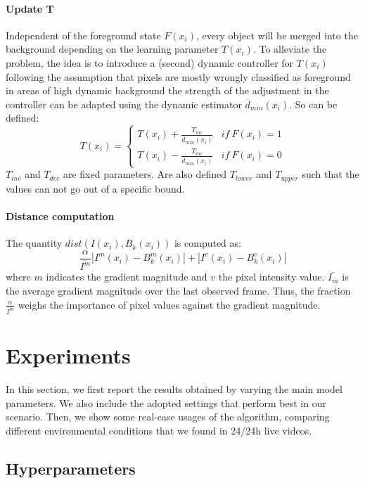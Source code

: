 \paragraph{Update T}
Independent of the foreground state $F(x_i)$, every object will be merged into the background depending on the learning parameter
$T(x_i)$. To alleviate the problem, the idea is to introduce a
(second) dynamic controller for $T(x_i)$ following the assumption that pixels are mostly wrongly classified as foreground in areas of high dynamic background the strength of the adjustment in the controller can be adapted using the dynamic estimator $\overline{d}_{min}(x_i)$. So can be defined:
\begin{equation}
T(x_i)=\begin{cases} T(x_i)+\frac{T_{inc}}{\overline{d}_{min}(x_i)} &if \ F(x_i)=1 \\ T(x_i)-\frac{T_{inc}}{\overline{d}_{min}(x_i)} &if \ F(x_i)=0 \end{cases}
\end{equation}
$T_{inc}$ and $T_{dec}$ are fixed parameters. Are also defined $T_{lower}$ and $T_{upper}$ such that the values can not go out of a specific bound.
\paragraph{Distance computation}
The quantity $ dist(I(x_i),B_k(x_i)) $ is computed as:
\begin{equation} \label{eq:dist}
\frac{\alpha}{\overline{I^m}}|I^m(x_i) - B_k^m(x_i)| + |I^v(x_i) - B_k^v(x_i)|
\end{equation}
where $m$ indicates the gradient magnitude and $v$ the pixel intensity value. $\overline{I_m}$ is the average gradient magnitude over the last observed frame. Thus, the fraction $\frac{\alpha}{\overline{I^m}}$ weighs the importance of pixel values against the gradient magnitude.

\section*{Experiments}

In this section, we first report the results obtained by varying the main model parameters. We also include the adopted settings that perform best in our scenario. Then, we show some real-case usages of the algorithm, comparing different environmental conditions that we found in 24/24h live videos.

\subsection{Hyperparameters}

